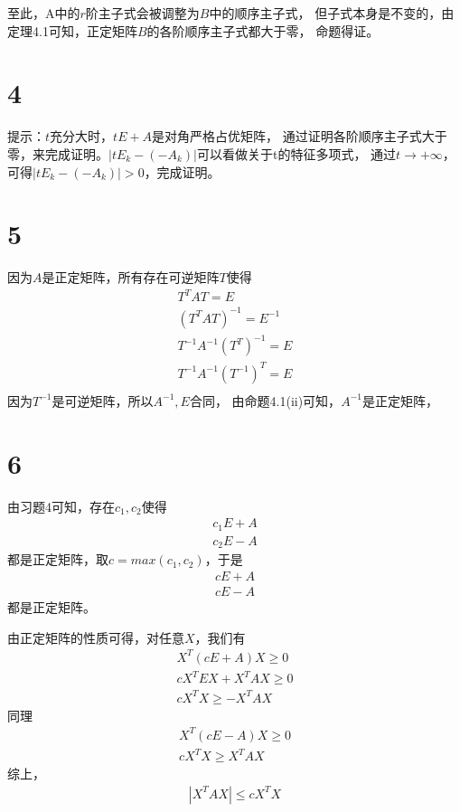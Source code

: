 \documentclass{article}
\begin{document}
至此，A中的$r$阶主子式会被调整为$B$中的顺序主子式，
但子式本身是不变的，由定理4.1可知，正定矩阵$B$的各阶顺序主子式都大于零，
命题得证。

\section*{4}

提示：$t$充分大时，$tE + A$是对角严格占优矩阵，
通过证明各阶顺序主子式大于零，来完成证明。$|tE_k - (- A_k)|$可以看做关于t的特征多项式，
通过$t \to +\infty$，可得$|tE_k - (- A_k)| > 0$，完成证明。

\section*{5}

因为$A$是正定矩阵，所有存在可逆矩阵$T$使得
\begin{align*}
  T^T A T = E                    \\
  (T^T A T)^{-1} = E^{-1}        \\
  T^{-1} A^{-1} (T^T)^{-1} = E   \\
  T^{-1} A^{-1} (T^{-1})^{T} = E \\
\end{align*}
因为$T^{-1}$是可逆矩阵，所以$A^{-1}, E$合同，
由命题4.1(ii)可知，$A^{-1}$是正定矩阵，

\section*{6}

由习题4可知，存在$c_1, c_2$使得
\begin{align*}
  c_1 E + A \\
  c_2 E - A
\end{align*}
都是正定矩阵，取$c = max(c_1, c_2)$，于是
\begin{align*}
  c E + A \\
  c E - A
\end{align*}
都是正定矩阵。

由正定矩阵的性质可得，对任意$X$，我们有
\begin{align*}
  X^T (c E + A) X \geq 0    \\
  cX^T E X + X^T A X \geq 0 \\
  cX^T  X \geq - X^T A X
\end{align*}
同理
\begin{align*}
  X^T (c E - A) X \geq 0 \\
  cX^T X \geq X^T A X
\end{align*}
综上，
\begin{align*}
  |X^T A X| \leq c X^T X
\end{align*}
\end{document}
